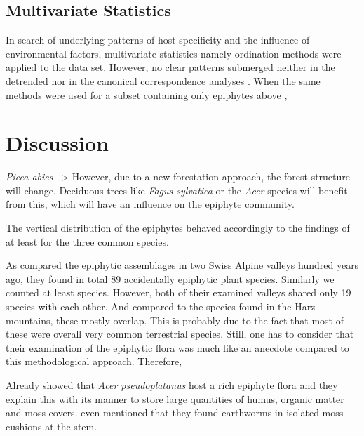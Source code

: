 \documentclass[12pt, a4paper, oneside, draft]{scrartcl}
\begin{document}
	\subsection{Multivariate Statistics}
	In search of underlying patterns of host specificity and the influence of environmental factors, multivariate statistics namely ordination methods were applied to the data set. However, no clear patterns submerged neither in the detrended nor in the canonical correspondence analyses . When the same methods were used for a subset containing only epiphytes above , 
	
	

\section{Discussion}
\textit{Picea abies} -->  However, due to a new forestation approach, the forest structure will change. Deciduous trees like \textit{Fagus sylvatica} or the  \textit{Acer} species will benefit from this, which will have an influence on the epiphyte community.

The vertical distribution of the epiphytes behaved accordingly to the findings of \textcite{Zotz2003} at least for the three common species.

 As \textcite[pp.~52]{Staeger1908} compared the epiphytic assemblages in two Swiss Alpine valleys hundred years ago, they found in total 89 accidentally epiphytic plant species. Similarly we counted at least  species. However, both of their examined valleys shared only 19 species with each other. And compared to the species found in the Harz mountains, these mostly overlap. This is probably due to the fact that most of these were overall very common terrestrial species. Still, one has to consider that their examination of the epiphytic flora was much like an anecdote compared to this methodological approach. Therefore, 

Already \textcite{Staeger1912} showed that \textit{Acer pseudoplatanus} host a rich epiphyte flora and they explain this with its manner to store large quantities of humus, organic matter and moss covers.  \textcite{Staeger1912} even mentioned that they found earthworms in isolated moss cushions at the stem.
\end{document}
